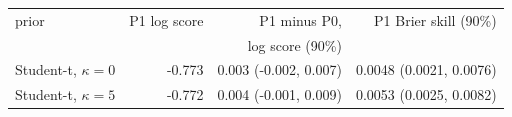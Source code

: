 \begin{tabular}{lrrr}
\toprule
prior & P1 log score & P1 minus P0, & P1 Brier skill (90\%) \\
 & & log score (90\%) & \\
\midrule
Student-t, $\kappa = 0$ & -0.773 & 0.003 (-0.002, 0.007) & 0.0048 (0.0021, 0.0076) \\
Student-t, $\kappa = 5$ & -0.772 & 0.004 (-0.001, 0.009) & 0.0053 (0.0025, 0.0082) \\

\end{tabular}
